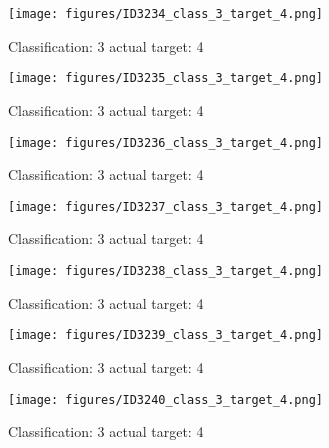 \begin{figure}[h!]
\begin{center}
\texttt{[image: figures/ID3234\_class\_3\_target\_4.png]}
\end{center}
\caption{ Classification: 3 actual target: 4}
\label{fig:ID3234_class_3_target_4}
\end{figure}
\begin{figure}[h!]
\begin{center}
\texttt{[image: figures/ID3235\_class\_3\_target\_4.png]}
\end{center}
\caption{ Classification: 3 actual target: 4}
\label{fig:ID3235_class_3_target_4}
\end{figure}
\begin{figure}[h!]
\begin{center}
\texttt{[image: figures/ID3236\_class\_3\_target\_4.png]}
\end{center}
\caption{ Classification: 3 actual target: 4}
\label{fig:ID3236_class_3_target_4}
\end{figure}
\begin{figure}[h!]
\begin{center}
\texttt{[image: figures/ID3237\_class\_3\_target\_4.png]}
\end{center}
\caption{ Classification: 3 actual target: 4}
\label{fig:ID3237_class_3_target_4}
\end{figure}
\begin{figure}[h!]
\begin{center}
\texttt{[image: figures/ID3238\_class\_3\_target\_4.png]}
\end{center}
\caption{ Classification: 3 actual target: 4}
\label{fig:ID3238_class_3_target_4}
\end{figure}
\begin{figure}[h!]
\begin{center}
\texttt{[image: figures/ID3239\_class\_3\_target\_4.png]}
\end{center}
\caption{ Classification: 3 actual target: 4}
\label{fig:ID3239_class_3_target_4}
\end{figure}
\begin{figure}[h!]
\begin{center}
\texttt{[image: figures/ID3240\_class\_3\_target\_4.png]}
\end{center}
\caption{ Classification: 3 actual target: 4}
\label{fig:ID3240_class_3_target_4}
\end{figure}
